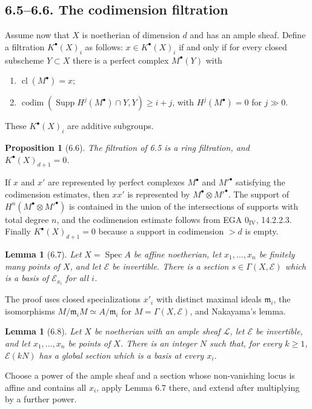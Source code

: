 \documentclass[11pt]{article}
\theoremstyle{plain}
\newtheorem{proposition}[theorem]{Proposition}
\newtheorem{lemma}[theorem]{Lemma}
\theoremstyle{definition}
\theoremstyle{remark}
\DeclareMathOperator{\Spec}{Spec}
\DeclareMathOperator{\Supp}{Supp}
\DeclareMathOperator{\codim}{codim}
\DeclareMathOperator{\cl}{cl}
\providecommand{\codim}{\operatorname{codim}}
\begin{document}
\subsection*{6.5--6.6. The codimension filtration}
Assume now that $X$ is noetherian of dimension $d$ and has an ample sheaf. Define a filtration $K^{\bullet}(X)_i$ as follows: $x\in K^{\bullet}(X)_i$ if and only if for every closed subscheme $Y\subset X$ there is a perfect complex $M^{\bullet}(Y)$ with
\begin{enumerate}[label=(\alph*)]
\item $\cl(M^{\bullet})=x$;
\item $\codim(\Supp H^j(M^{\bullet})\cap Y,Y)\geq i+j$, with $H^j(M^{\bullet})=0$ for $j\gg 0$.
\end{enumerate}
These $K^{\bullet}(X)_i$ are additive subgroups.

\begin{proposition}[6.6]
The filtration of 6.5 is a ring filtration, and $K^{\bullet}(X)_{d+1}=0$.
\end{proposition}

If $x$ and $x'$ are represented by perfect complexes $M^{\bullet}$ and $M'^{\bullet}$ satisfying the codimension estimates, then $xx'$ is represented by $M^{\bullet}\otimes M'^{\bullet}$. The support of $H^n(M^{\bullet}\otimes M'^{\bullet})$ is contained in the union of the intersections of supports with total degree $n$, and the codimension estimate follows from EGA $0_{\mathrm{IV}}$, 14.2.2.3. Finally $K^{\bullet}(X)_{d+1}=0$ because a support in codimension $>d$ is empty.

\begin{lemma}[6.7]
Let $X=\Spec A$ be affine noetherian, let $x_1,\ldots,x_n$ be finitely many points of $X$, and let $\mathcal E$ be invertible. There is a section $s\in\Gamma(X,\mathcal E)$ which is a basis of $\mathcal E_{x_i}$ for all $i$.
\end{lemma}
The proof uses closed specializations $x'_i$ with distinct maximal ideals $\mathfrak m_i$, the isomorphisms $M/\mathfrak m_iM\simeq A/\mathfrak m_i$ for $M=\Gamma(X,\mathcal E)$, and Nakayama's lemma.

\begin{lemma}[6.8]
Let $X$ be noetherian with an ample sheaf $\mathcal L$, let $\mathcal E$ be invertible, and let $x_1,\ldots,x_n$ be points of $X$. There is an integer $N$ such that, for every $k\geq 1$, $\mathcal E(kN)$ has a global section which is a basis at every $x_i$.
\end{lemma}
Choose a power of the ample sheaf and a section whose non-vanishing locus is affine and contains all $x_i$, apply Lemma 6.7 there, and extend after multiplying by a further power.
\end{document}
